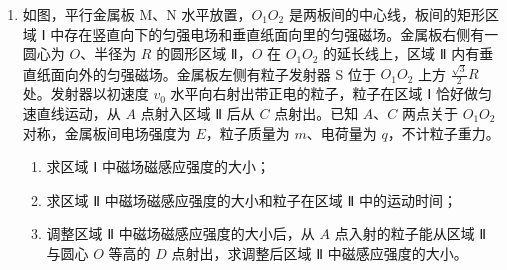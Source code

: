 \documentclass[\gkver]{gaokaozhenti}
\begin{document}
\begin{enumerate}
\jdanswer{
\begin{enumerate}
	\item
	$1 \Us$

	\item
	$10 \Ums$

	\item
	$3000 \UN$
\end{enumerate}
}

\item
如图，平行金属板 M、N 水平放置，$O_{1}O_{2}$ 是两板间的中心线，板间的矩形区域 Ⅰ 中存在竖直向下的匀强电场和垂直纸面向里的匀强磁场。金属板右侧有一圆心为 $O$、半径为 $R$ 的圆形区域 Ⅱ，$O$ 在 $O_{1}O_{2}$ 的延长线上，区域 Ⅱ 内有垂直纸面向外的匀强磁场。金属板左侧有粒子发射器 S 位于 $O_{1}O_{2}$ 上方 $\frac{\sqrt{3}}{2}R$ 处。发射器以初速度 $v_{0}$ 水平向右射出带正电的粒子，粒子在区域 Ⅰ 恰好做匀速直线运动，从 $A$ 点射入区域 Ⅱ 后从 $C$ 点射出。已知 $A$、$C$ 两点关于 $O_{1}O_{2}$ 对称，金属板间电场强度为 $E$，粒子质量为 $m$、电荷量为 $q$，不计粒子重力。
\begin{enumerate}
	\item
	求区域 Ⅰ 中磁场磁感应强度的大小；
	\item
	求区域 Ⅱ 中磁场磁感应强度的大小和粒子在区域 Ⅱ 中的运动时间；
	\item
	调整区域 Ⅱ 中磁场磁感应强度的大小后，从 $A$ 点入射的粒子能从区域 Ⅱ 与圆心 $O$ 等高的 $D$ 点射出，求调整后区域 Ⅱ 中磁感应强度的大小。
\end{enumerate}

\end{enumerate}
\end{document}

